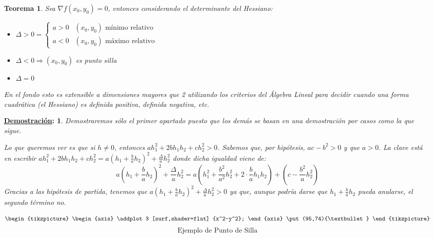 \documentclass[10pt,a4paper,openright]{book}
\theoremstyle{break}
\newtheorem*{theo}{Teorema}
\newtheorem*{demo}{\underline{Demostración}:}
\begin{document}
\begin{theo}
Sea $\nabla f (x_0, y_0) = 0$, entonces considerando el determinante del Hessiano:
\begin{itemize}
\item $\Delta > 0 = \begin{cases} a > 0 & (x_0, y_0) \mbox{ mínimo relativo} \\ a < 0 & (x_0, y_0) \mbox{ máximo relativo}\end{cases}$
\item $\Delta < 0 \Rightarrow (x_0, y_0)$ es punto silla
\item $\Delta = 0$
\end{itemize}
En el fondo esto es extensible a dimensiones mayores que 2 utilizando los criterios del Álgebra Lineal para decidir cuando una forma cuadrática (el Hessiano) es definida positiva, definida negativa, etc.
\end{theo}

\begin{demo}
Demostraremos sólo el primer apartado puesto que los demás se basan en una demostración por casos como la que sigue.

Lo que queremos ver es que si $h \neq 0$, entonces $ah_1^2 + 2bh_1h_2 + ch_2^2 > 0$. Sabemos que, por hipótesis, $ac - b^2 > 0$ y que $a > 0$. La clave está en escribir $ah_1^2 + 2bh_1h_2 + ch_2^2 = a \left( h_1 + \frac{b}{a} h_2 \right)^2 + \frac{\Delta}{a} h_2^2$ donde dicha igualdad viene de:
$$ a \left( h_1 + \frac{b}{a} h_2 \right)^2 + \frac{\Delta}{a} h_2^2 = a \left( h_1^2 + \frac{b^2}{a^2} h_2^2 + 2 \cdot \frac{b}{a} h_1 h_2\right) + \left( c - \frac{b^2}{a} h_2^2 \right)$$
Gracias a las hipótesis de partida, tenemos que $ a \left( h_1 + \frac{b}{a} h_2 \right)^2 + \frac{\Delta}{a} h_2^2 >0 $ ya que, aunque podría darse que $ h_1 + \frac{b}{a} h_2 $ pueda anularse, el segundo término no.
\end{demo}
$$
\begin{tikzpicture}
\begin{axis}
\addplot3 [surf,shader=flat] {x^2-y^2};
\end{axis}
\put(95,74){\textbullet}
\end{tikzpicture}$$
$$\mbox{Ejemplo de Punto de Silla}$$
\end{document}
